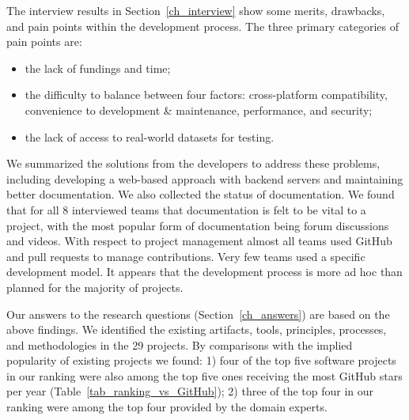\documentclass[final, 3p, times, authoryear]{elsarticle}
\begin{document}
The interview results in Section~\ref{ch_interview} show some merits, drawbacks,
and pain points within the development process. The three primary categories of
pain points are:
\begin{itemize}
\item the lack of fundings and time;
\item the difficulty to balance between four factors: cross-platform
compatibility, convenience to development \& maintenance, performance, and
security;
\item the lack of access to real-world datasets for testing.
\end{itemize}
We summarized the solutions from the developers to address these problems,
including developing a web-based approach with backend servers and maintaining
better documentation. We also collected the status of documentation.  We found
that for all 8 interviewed teams that documentation is felt to be vital to a
project, with the most popular form of documentation being forum discussions and
videos.  With respect to project management almost all teams used GitHub and
pull requests to manage contributions.  Very few teams used a specific
development model.  It appears that the development process is more ad hoc than
planned for the majority of projects.

Our answers to the research questions (Section~\ref{ch_answers}) are based on
the above findings. We identified the existing artifacts, tools, principles,
processes, and methodologies in the 29 projects. By comparisons with the implied
popularity of existing projects we found: 1) four of the top five software
projects in our ranking were also among the top five ones receiving the most
GitHub stars per year (Table~\ref{tab_ranking_vs_GitHub}); 2) three of the top
four in our ranking were among the top four provided by the domain experts.
\end{document}
